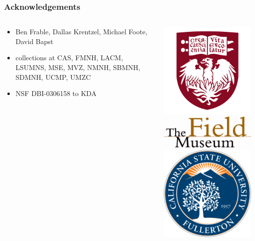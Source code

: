 \documentclass{beamer}\usepackage{graphicx, color}
\begin{document}
\begin{frame}
  \frametitle{Acknowledgements}
  \begin{columns}
    \begin{column}{0.5\textwidth}
      \begin{itemize}
        \item Ben Frable, Dallas Krentzel, Michael Foote, David Bapst
        \item collections at CAS, FMNH, LACM, LSUMNS, MSE, MVZ, NMNH, SBMNH, SDMNH, UCMP, UMZC
        \item NSF DBI-0306158 to KDA
      \end{itemize}
    \end{column}
    \begin{column}{0.5\textwidth}
      \includegraphics[height = 0.25\textheight, keepaspectratio = true]{figure/chicago} \\
      \includegraphics[height = 0.25\textheight, width = \textwidth, keepaspectratio = true]{figure/field} \\
      \includegraphics[height = 0.25\textheight, keepaspectratio = true]{figure/csu}
    \end{column}
  \end{columns}
\end{frame}
\end{document}
